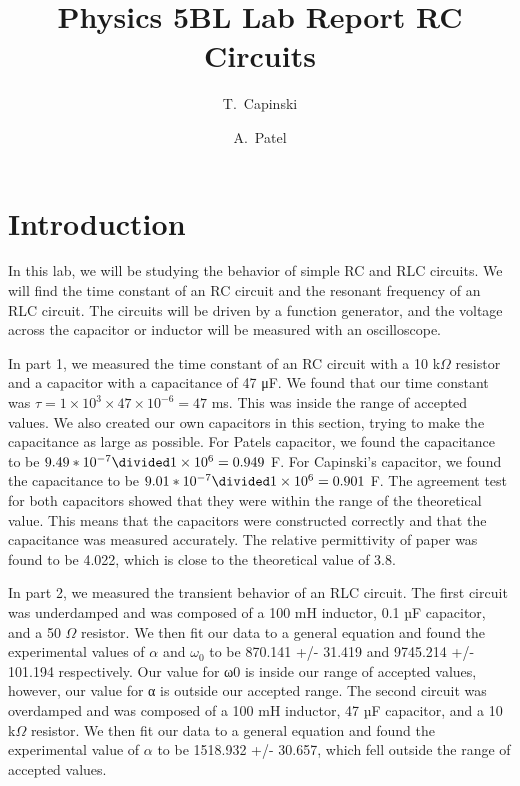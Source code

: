 \documentclass[11pt]{article}
\title{Physics 5BL Lab Report RC Circuits}
\author{T.~Capinski \and A.~Patel}
\let\oldsection\section
\renewcommand\section{\clearpage\oldsection}
\begin{document}
    \maketitle
    \tableofcontents

    \section*{Introduction}\label{sec:introduction}

    In this lab, we will be studying the behavior of simple RC and RLC circuits.
    We will find the time constant of an RC circuit and the resonant frequency of an RLC circuit.
    The circuits will be driven by a function generator, and the voltage across the capacitor or inductor will be measured with an oscilloscope.

    In part 1, we measured the time constant of an RC circuit with a 10 k$\Omega$ resistor and a capacitor with a capacitance of 47 μF.
    We found that our time constant was $\tau = 1 \times 10^{3} \times 47 \times 10^{-6} = 47$ ms.
    This was inside the range of accepted values.
    We also created our own capacitors in this section, trying to make the capacitance as large as possible.
    For Patels capacitor, we found the capacitance to be $9.49*10^{-7} \divided 1 \times 10^{6} = 0.949$ F\@.
    For Capinski's capacitor, we found the capacitance to be $9.01*10^{-7} \divided 1 \times 10^{6} = 0.901$ F\@.
    The agreement test for both capacitors showed that they were within the range of the theoretical value.
    This means that the capacitors were constructed correctly and that the capacitance was measured accurately.
    The relative permittivity of paper was found to be 4.022, which is close to the theoretical value of 3.8.


    In part 2, we measured the transient behavior of an RLC circuit.
    The first circuit was underdamped and was composed of a 100 mH inductor, 0.1 µF capacitor, and a 50 $\Omega$ resistor. We then fit our data to a general equation and found the experimental values of $\alpha$ and $\omega_0$ to be 870.141 +/- 31.419 and 9745.214 +/- 101.194 respectively. Our value for ω0 is inside our range of accepted values, however, our value for α is outside our accepted range. The second circuit was overdamped and was composed of a 100 mH inductor, 47 µF capacitor, and a 10 k$\Omega$ resistor. We then fit our data to a general equation and found the experimental value of $\alpha$ to be 1518.932 +/- 30.657, which fell outside the range of accepted values.
\end{document}
